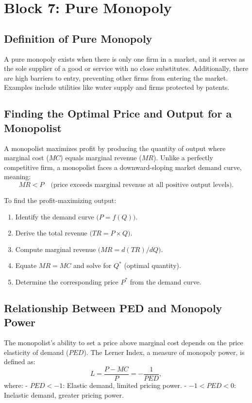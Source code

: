 \chapter*{Block 7: Pure Monopoly}

\section*{Definition of Pure Monopoly}
A pure monopoly exists when there is only one firm in a market, and it serves as the sole supplier of a good or service with no close substitutes. Additionally, there are high barriers to entry, preventing other firms from entering the market. Examples include utilities like water supply and firms protected by patents.

\section*{Finding the Optimal Price and Output for a Monopolist}
A monopolist maximizes profit by producing the quantity of output where marginal cost (\(MC\)) equals marginal revenue (\(MR\)). Unlike a perfectly competitive firm, a monopolist faces a downward-sloping market demand curve, meaning:
\[
MR < P \quad \text{(price exceeds marginal revenue at all positive output levels)}.
\]

To find the profit-maximizing output:
\begin{enumerate}
    \item Identify the demand curve \(\bigl(P = f(Q)\bigr)\).
    \item Derive the total revenue \(\bigl(TR = P \times Q\bigr)\).
    \item Compute marginal revenue \(\bigl(MR = d(TR)/dQ\bigr)\).
    \item Equate \(MR = MC\) and solve for \(Q^*\) (optimal quantity).
    \item Determine the corresponding price \(P^*\) from the demand curve.
\end{enumerate}

\section*{Relationship Between PED and Monopoly Power}
The monopolist's ability to set a price above marginal cost depends on the price elasticity of demand (\(PED\)). The Lerner Index, a measure of monopoly power, is defined as:
\[
L = \frac{P - MC}{P} = -\frac{1}{PED},
\]
where:
- \(PED < -1\): Elastic demand, limited pricing power.
- \(-1 < PED < 0\): Inelastic demand, greater pricing power.

